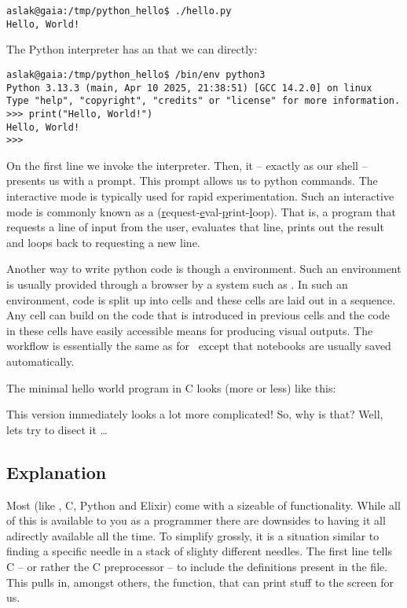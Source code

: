 \begin{verbatim}
aslak@gaia:/tmp/python_hello$ ./hello.py
Hello, World!
\end{verbatim}

The Python interpreter has an  that we can  directly:

\begin{verbatim}
aslak@gaia:/tmp/python_hello$ /bin/env python3
Python 3.13.3 (main, Apr 10 2025, 21:38:51) [GCC 14.2.0] on linux
Type "help", "copyright", "credits" or "license" for more information.
>>> print("Hello, World!")
Hello, World!
>>> 
\end{verbatim}

On the first line we invoke the interpreter. Then, it -- exactly as our shell -- presents us with a prompt. This prompt allows us to  python commands. The interactive mode is typically used for rapid experimentation. Such an interactive mode is commonly known as a  (\underline{r}equest-\underline{e}val-\underline{p}rint-\underline{l}oop). That is, a program that requests a line of input from the user, evaluates that line, prints out the result and loops back to requesting a new line.

Another way to write python code is though a  environment. Such an environment is usually provided through a browser by a system such as . In such an environment, code is split up into cells and these cells are laid out in a sequence. Any cell can build on the code that is introduced in previous cells and the code in these cells have easily accessible means for producing visual outputs. The workflow is essentially the same as for \csharp\ except that notebooks are usually saved automatically.


The minimal hello world program in C looks (more or less) like this:


This version immediately looks a lot more complicated! So, why is that? Well, lets try to disect it \ldots

\subsection{Explanation}

Most  (like \csharp, C, Python and Elixir) come with a sizeable  of functionality. While all of this is available to you as a programmer there are downsides to having it all adirectly available all the time. To simplify grossly, it is a situation similar to finding a specific needle in a stack of slighty different needles. The first line tells C -- or rather the C preprocessor -- to include the definitions present in the  file. This pulls in, amongst others, the  function, that can print stuff to the screen for us.

